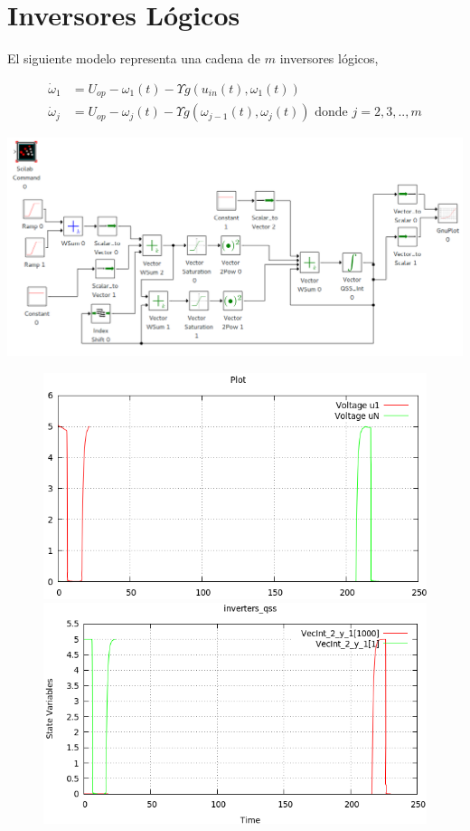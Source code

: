 \section{Inversores Lógicos}
	El siguiente modelo representa una cadena de $m$ inversores lógicos, 

\begin{align*}
\dot{\omega}_1 & = U_{op} - \omega_1(t) - \Upsilon g (u_{in}(t), \omega_{1} (t))    \\
\dot{\omega}_j & = U_{op} - \omega_j(t) - \Upsilon g (\omega_{j-1}(t), \omega_{j} (t)) \textrm{ donde $j = 2, 3, .., m$}
\end{align*}


\includegraphics[width=0.75\linewidth]{inverters}

\begin{figure}[H]
\centering
\begin{minipage}{0.5\textwidth}
\centering
 \includegraphics[width=\linewidth]{inversers-pd}
\end{minipage}\hfill
\begin{minipage}{0.5\textwidth}
\centering
 \includegraphics[width=\linewidth]{inversers-qss}
\end{minipage}
\end{figure}

